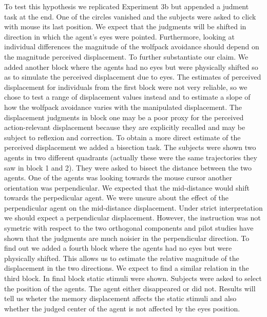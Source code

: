 \documentclass{article}
\begin{document}
To test this hypothesis we replicated Experiment 3b but appended a judment task at the end. One of the circles vanished and the subjects were asked to click with mouse its last position. We expect that the judgments will be shifted in direction in which the agent's eyes were pointed. Furthermore, looking at individual differences the magnitude of the wolfpack avoidance should depend on the magnitude perceived displacement. To further substantiate our claim. We added another block where the agents had no eyes but were physically shifted so as to simulate the perceived displacement due to eyes. The estimates of perceived displacement for individuals from the first block were not very reliable, so we chose to test a range of displacement values instead and to estimate a slope of how the wolfpack avoidance varies with the manipulated displacement. The displacement judgments in block one may be a poor proxy for the perceived action-relevant displacement because they are explicitly recalled and may be subject to reflexion and correction. To obtain a more direct estimate of the perceived displacement we added a bisection task. The subjects were shown two agents in two different quadrants (actually these were the same trajectories they saw in block 1 and 2). They were asked to bisect the distance between the two agents. One of the agents was looking towards the mouse cursor another orientation was perpendicular. We expected that the mid-distance would shift towards the perpedicular agent. We were unsure about the effect of the perpendicular agent on the mid-distance displacement. Under strict interpretation we should expect a perpendicular displacement. However, the instruction was not symetric with respect to the two orthogonal components and pilot studies have shown that the judgments are much noisier in the perpendicular direction. To find out we added a fourth block where the agents had no eyes but were physically shifted. This allows us to estimate the relative magnitude of the displacement in the two directions. We expect to find a similar relation in the third block. In final block static stimuli were shown. Subjects were asked to select the position of the agents. The agent either disappeared or did not. Results will tell us wheter the memory displacement affects the static stimuli and also whether the judged center of the agent is not affected by the eyes position.  
   
\end{document}

